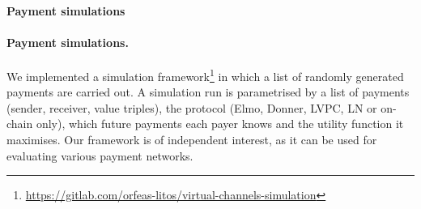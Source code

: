   \makeatletter%
    {\paragraph{Payment simulations}}%
    {\paragraph{Payment simulations.}}%
  \makeatother%
  We implemented a simulation
  framework\footnote{\url{https://gitlab.com/orfeas-litos/virtual-channels-simulation}}
  in which a list of randomly generated payments are carried out.
  A simulation run is parametrised by a list of payments
  (sender, receiver, value triples), the protocol (Elmo, Donner, LVPC, LN or
  on-chain only), which future payments each payer knows and the utility
  function it maximises.
%
%
  Our framework is of independent interest, as it can be used for evaluating
  various payment networks.

